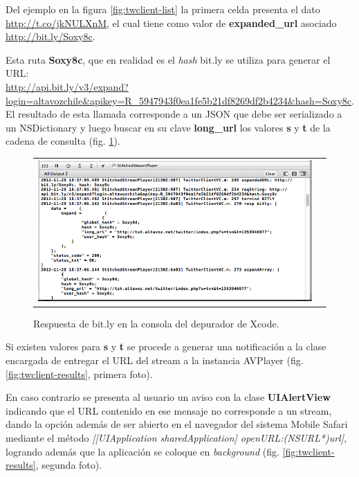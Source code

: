 Del ejemplo en la figura \ref{fig:twclient-list} la primera celda presenta el dato \url{http://t.co/jkNULXnM}, el cual tiene como valor de \textbf{expanded\_url} asociado \url{http://bit.ly/Soxy8c}.

Esta ruta \textbf{Soxy8c}, que en realidad es el \textit{hash} bit.ly se utiliza para generar el URL:\\
\url{http://api.bit.ly/v3/expand?login=altavozchile&apikey=R_5947943f0ea1fe5b21df8269df2b4234&hash=Soxy8c}. \\

El resultado de esta llamada corresponde a un JSON que debe ser serializado a un NSDictionary y luego buscar en su clave \textbf{long\_url} los valores \textbf{s} y \textbf{t} de la cadena de consulta (fig. \ref{fig:twclient-debug}).\\

\begin{figure}[H]
	\centering
	\begin{tabular}{cc}
	\includegraphics[scale=0.55]{imgs/twclient-debug.png}
	\end{tabular}
	\caption{Respuesta de bit.ly en la consola del depurador de Xcode.}
	\label{fig:twclient-debug}
\end{figure}


Si existen valores para \textbf{s} y \textbf{t} se procede a generar una notificación a la clase encargada de entregar el URL del stream a la instancia AVPlayer (fig. \ref{fig:twclient-results}, primera foto).

En caso contrario se presenta al usuario un aviso con la clase \textbf{UIAlertView} indicando que el URL contenido en ese mensaje no corresponde a un stream, dando la opción además de ser abierto en el navegador del sistema Mobile Safari mediante el método \textit{[[UIApplication sharedApplication] openURL:(NSURL*)url]}, logrando además que la aplicación se coloque en \textit{background} (fig. \ref{fig:twclient-results}, segunda foto).

